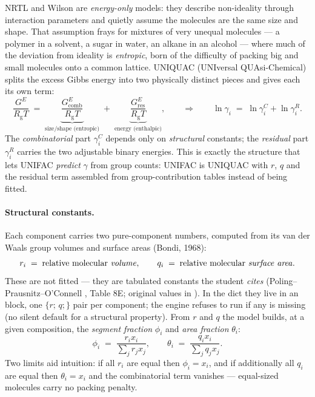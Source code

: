 \documentclass[11pt,a4paper]{article}
\newcommand{\Rgas}{R_{\!\mathrm{g}}}                %
\newcommand{\Gex}{G^{E}}
\begin{document}
NRTL and Wilson are \emph{energy-only} models: they describe
non-ideality through interaction parameters and quietly assume the
molecules are the same size and shape. That assumption frays for
mixtures of very unequal molecules --- a polymer in a solvent, a sugar
in water, an alkane in an alcohol --- where much of the deviation from
ideality is \emph{entropic}, born of the difficulty of packing big and
small molecules onto a common lattice. UNIQUAC (UNIversal QUAsi-Chemical)
\cite{Abrams1975} splits the excess Gibbs energy into two physically
distinct pieces and gives each its own term:
\begin{equation}
   \frac{\Gex}{\Rgas T}
   \;=\;
   \underbrace{\frac{\Gex_{\mathrm{comb}}}{\Rgas T}}_{\text{size/shape (entropic)}}
   \;+\;
   \underbrace{\frac{\Gex_{\mathrm{res}}}{\Rgas T}}_{\text{energy (enthalpic)}},
   \qquad\Longrightarrow\qquad
   \ln \gamma_i \;=\; \ln \gamma_i^{C} + \ln \gamma_i^{R}.
   \label{eq:uniquac-split}
\end{equation}
The \emph{combinatorial} part $\gamma_i^{C}$ depends only on
\emph{structural} constants; the \emph{residual} part $\gamma_i^{R}$
carries the two adjustable binary energies. This is exactly the
structure that lets UNIFAC \emph{predict} $\gamma$ from group counts:
UNIFAC is UNIQUAC with $r$, $q$ and the residual term assembled from
group-contribution tables instead of being fitted.

\paragraph{Structural constants.} Each component carries two
pure-component numbers, computed from its van der Waals group volumes and
surface areas (Bondi, 1968):
\begin{equation}
   r_i \;=\; \text{relative molecular \emph{volume}}, \qquad
   q_i \;=\; \text{relative molecular \emph{surface area}}.
\end{equation}
These are not fitted --- they are tabulated constants the student
\emph{cites} (Poling--Prausnitz--O'Connell \cite{RPP}, Table 8E;
original values in \cite{Abrams1975}). In the dict they live in an
 block, one $\{r;\,q;\}$ pair per component; the
engine refuses to run if any is missing (no silent default for a
structural property). From $r$ and $q$ the model builds, at a given
composition, the \emph{segment fraction} $\phi_i$ and \emph{area
fraction} $\theta_i$:
\begin{equation}
   \phi_i \;=\; \frac{r_i x_i}{\displaystyle\sum_j r_j x_j}, \qquad
   \theta_i \;=\; \frac{q_i x_i}{\displaystyle\sum_j q_j x_j}.
   \label{eq:uniquac-fractions}
\end{equation}
Two limits aid intuition: if all $r_i$ are equal then $\phi_i = x_i$,
and if additionally all $q_i$ are equal then $\theta_i = x_i$ and the
combinatorial term vanishes --- equal-sized molecules carry no packing
penalty.
\end{document}
